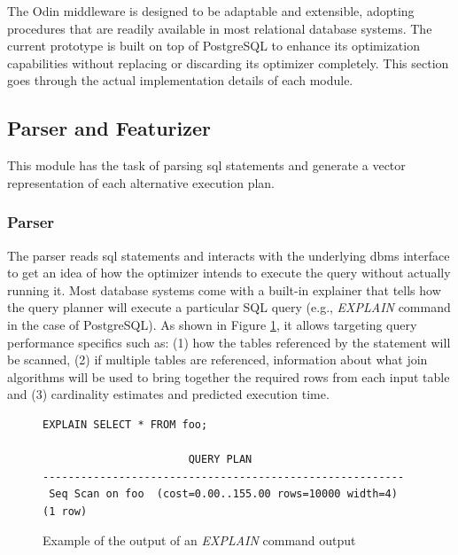 The Odin middleware is designed to be adaptable and extensible, adopting procedures that are readily available in most relational database systems. The current prototype is built on top of PostgreSQL to enhance its optimization capabilities without replacing or discarding its optimizer completely. This section goes through the actual implementation details of each module.

\subsection{Parser and Featurizer}

This module has the task of parsing \gls{sql} statements and generate a vector representation of each alternative execution plan.

\subsubsection{Parser}

The parser reads \gls{sql} statements and interacts with the underlying \gls{dbms} interface to get an idea of how the optimizer intends to execute the query without actually running it. Most database systems come with a built-in explainer that tells how the query planner will execute a particular SQL query (e.g., \textit{EXPLAIN} command in the case of PostgreSQL). As shown in Figure \ref{fig:explain_command}, it allows targeting query performance specifics such as: (1) how the tables referenced by the statement will be scanned, (2) if multiple tables are referenced, information about what join algorithms will be used to bring together the required rows from each input table and (3) cardinality estimates and predicted execution time.

\begin{figure}[H]
\centering
\begin{minipage}{0.72\textwidth}
\begin{verbatim}
EXPLAIN SELECT * FROM foo;

                       QUERY PLAN
---------------------------------------------------------
 Seq Scan on foo  (cost=0.00..155.00 rows=10000 width=4)
(1 row)
\end{verbatim}
\end{minipage}
\caption{Example of the output of an \textit{EXPLAIN} command output}
\label{fig:explain_command}
\end{figure}

